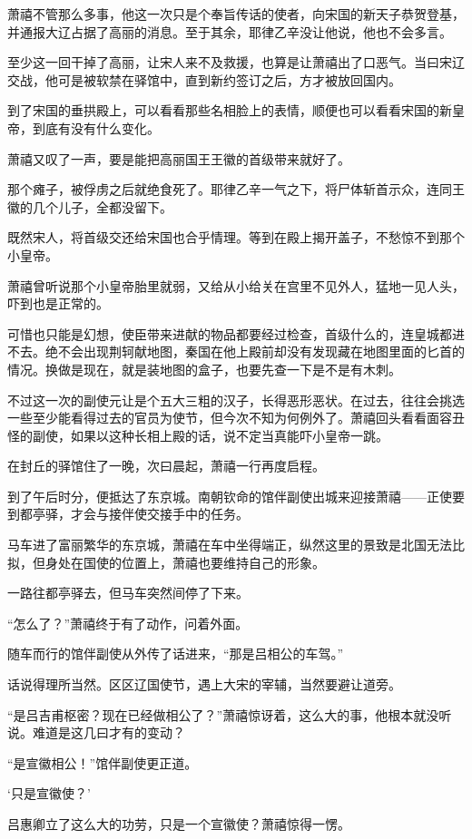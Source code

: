 萧禧不管那么多事，他这一次只是个奉旨传话的使者，向宋国的新天子恭贺登基，并通报大辽占据了高丽的消息。至于其余，耶律乙辛没让他说，他也不会多言。

至少这一回干掉了高丽，让宋人来不及救援，也算是让萧禧出了口恶气。当曰宋辽交战，他可是被软禁在驿馆中，直到新约签订之后，方才被放回国内。

到了宋国的垂拱殿上，可以看看那些名相脸上的表情，顺便也可以看看宋国的新皇帝，到底有没有什么变化。

萧禧又叹了一声，要是能把高丽国王王徽的首级带来就好了。

那个瘫子，被俘虏之后就绝食死了。耶律乙辛一气之下，将尸体斩首示众，连同王徽的几个儿子，全都没留下。

既然宋人，将首级交还给宋国也合乎情理。等到在殿上揭开盖子，不愁惊不到那个小皇帝。

萧禧曾听说那个小皇帝胎里就弱，又给从小给关在宫里不见外人，猛地一见人头，吓到也是正常的。

可惜也只能是幻想，使臣带来进献的物品都要经过检查，首级什么的，连皇城都进不去。绝不会出现荆轲献地图，秦国在他上殿前却没有发现藏在地图里面的匕首的情况。换做是现在，就是装地图的盒子，也要先查一下是不是有木刺。

不过这一次的副使元让是个五大三粗的汉子，长得恶形恶状。在过去，往往会挑选一些至少能看得过去的官员为使节，但今次不知为何例外了。萧禧回头看看面容丑怪的副使，如果以这种长相上殿的话，说不定当真能吓小皇帝一跳。

在封丘的驿馆住了一晚，次曰晨起，萧禧一行再度启程。

到了午后时分，便抵达了东京城。南朝钦命的馆伴副使出城来迎接萧禧——正使要到都亭驿，才会与接伴使交接手中的任务。

马车进了富丽繁华的东京城，萧禧在车中坐得端正，纵然这里的景致是北国无法比拟，但身处在国使的位置上，萧禧也要维持自己的形象。

一路往都亭驿去，但马车突然间停了下来。

“怎么了？”萧禧终于有了动作，问着外面。

随车而行的馆伴副使从外传了话进来，“那是吕相公的车驾。”

话说得理所当然。区区辽国使节，遇上大宋的宰辅，当然要避让道旁。

“是吕吉甫枢密？现在已经做相公了？”萧禧惊讶着，这么大的事，他根本就没听说。难道是这几曰才有的变动？

“是宣徽相公！”馆伴副使更正道。

‘只是宣徽使？’

吕惠卿立了这么大的功劳，只是一个宣徽使？萧禧惊得一愣。

